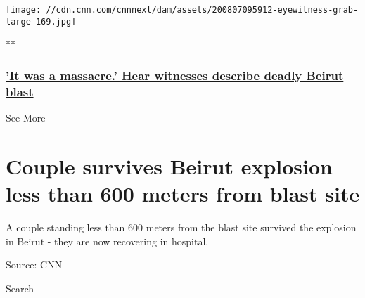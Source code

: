 \href{/videos/world/2020/08/06/beirut-blast-eyewitness-reaction-lon-orig-na.cnn/video/playlists/beirut-explosion/}{}

\texttt{[image: //cdn.cnn.com/cnnnext/dam/assets/200807095912-eyewitness-grab-large-169.jpg]}

**

\hypertarget{it-was-a-massacre-hear-witnesses-describe-deadly-beirut-blast}{%
\subsubsection{\texorpdfstring{\href{/videos/world/2020/08/06/beirut-blast-eyewitness-reaction-lon-orig-na.cnn/video/playlists/beirut-explosion/}{'It
was a massacre.' Hear witnesses describe deadly Beirut
blast}}{'It was a massacre.' Hear witnesses describe deadly Beirut blast}}\label{it-was-a-massacre-hear-witnesses-describe-deadly-beirut-blast}}

See More

\hypertarget{couple-survives-beirut-explosion-less-than-600-meters-from-blast-site-2}{%
\section{Couple survives Beirut explosion less than 600 meters from
blast
site}\label{couple-survives-beirut-explosion-less-than-600-meters-from-blast-site-2}}

A couple standing less than 600 meters from the blast site survived the
explosion in Beirut - they are now recovering in hospital.

Source: CNN

Search

